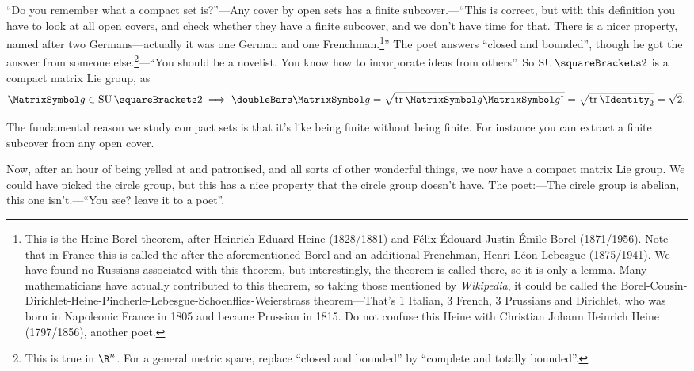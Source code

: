 \documentclass[10pt, a4paper, twoside]{lecturenotes}
\newcommand{\Rn}{{\R^n}}
\begin{document}
\begin{lecture}[date=2013-04-23]
``Do you remember what a compact set is?''---Any cover by open sets has a finite subcover.---``This is correct, but with this definition you have to look at all open covers, and check whether they have a finite subcover, and we don't have time for that. There is a nicer property, named after two Germans---actually it was one German and one Frenchman.\footnote{This is the Heine-Borel theorem, after Heinrich Eduard Heine (1828/1881) and Félix Édouard Justin Émile Borel (1871/1956). Note that in France this is called the  after the aforementioned Borel and an additional Frenchman, Henri Léon Lebesgue (1875/1941). We have found no Russians associated with this theorem, but interestingly, the theorem is called  there, so it is only a lemma. Many mathematicians have actually contributed to this theorem, so taking those mentioned by \emph{Wikipedia}, it could be called the Borel-Cousin-Dirichlet-Heine-Pincherle-Lebesgue-Schoenflies-Weierstrass theorem---That's 1 Italian, 3 French, 3 Prussians and Dirichlet, who was born in Napoleonic France in 1805 and became  Prussian in 1815. Do not confuse this Heine with Christian Johann Heinrich Heine (1797/1856), another poet.}'' The poet answers ``closed and bounded'', though he got the answer from someone else.\footnote{This is true in $\Rn$. For a general metric space, replace ``closed and bounded'' by ``complete and totally bounded''.}---``You should be a novelist. You know how to incorporate ideas from others''. So $\SpecialUnitaryGroup\of{2}$ is a compact matrix Lie group, as \[
\matg\in\SpecialUnitaryGroup\of 2 \Implies \FrobeniusNorm\matg = \sqrt{\Trace \matg\adj\matg} = \sqrt{\Trace \Identity_2} = \sqrt{2}\text.
\]

The fundamental reason we study compact sets is that it's like being finite without being finite. For instance you can extract a finite subcover from any open cover.

Now, after an hour of being yelled at and patronised, and all sorts of other wonderful things,  we now have a compact matrix Lie group. We could have picked the circle group, but this has a nice property that the circle group doesn't have. The poet:---The circle group is abelian, this one isn't.---``You see? leave it to a poet''.
\end{lecture}
\end{document}
